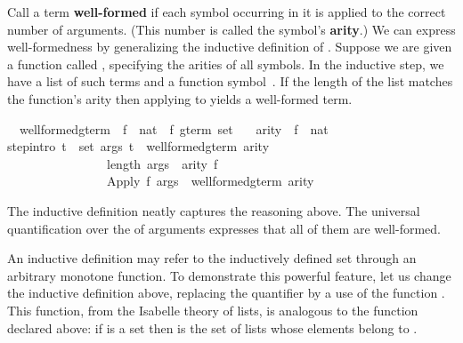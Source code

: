 \begin{isabellebody}
\begin{isamarkuptext}
Call a term \textbf{well-formed} if each symbol occurring in it is applied
to the correct number of arguments.  (This number is called the symbol's
\textbf{arity}.)  We can express well-formedness by
generalizing the inductive definition of
.
Suppose we are given a function called , specifying the arities
of all symbols.  In the inductive step, we have a list  of such
terms and a function  symbol~. If the length of the list matches the
function's arity  then applying  to  yields a well-formed
term.%
\end{isamarkuptext}%
\isamarkuptrue%
\isamarkupfalse%
\isanewline
\ \ well{\isacharunderscore}formed{\isacharunderscore}gterm\ {\isacharcolon}{\isacharcolon}\ {\isachardoublequoteopen}{\isacharparenleft}{\isacharprime}f\ {\isasymRightarrow}\ nat{\isacharparenright}\ {\isasymRightarrow}\ {\isacharprime}f\ gterm\ set{\isachardoublequoteclose}\isanewline
\ \ \ arity\ {\isacharcolon}{\isacharcolon}\ {\isachardoublequoteopen}{\isacharprime}f\ {\isasymRightarrow}\ nat{\isachardoublequoteclose}\isanewline
{}\isanewline
step{\isacharbrackleft}intro{\isacharbang}{\isacharbrackright}{\isacharcolon}\ {\isachardoublequoteopen}{\isasymlbrakk}{\isasymforall}t\ {\isasymin}\ set\ args{\isachardot}\ t\ {\isasymin}\ well{\isacharunderscore}formed{\isacharunderscore}gterm\ arity{\isacharsemicolon}\ \ \isanewline
\ \ \ \ \ \ \ \ \ \ \ \ \ \ \ \ length\ args\ {\isacharequal}\ arity\ f{\isasymrbrakk}\isanewline
\ \ \ \ \ \ \ \ \ \ \ \ \ \ \ {\isasymLongrightarrow}\ {\isacharparenleft}Apply\ f\ args{\isacharparenright}\ {\isasymin}\ well{\isacharunderscore}formed{\isacharunderscore}gterm\ arity{\isachardoublequoteclose}%
\begin{isamarkuptext}%
The inductive definition neatly captures the reasoning above.
The universal quantification over the
 of arguments expresses that all of them are well-formed.%
%
\end{isamarkuptext}%
\isamarkuptrue%
%
\isamarkuptrue%
%
\begin{isamarkuptext}%
% 
An inductive definition may refer to the
inductively defined  set through an arbitrary monotone function.  To
demonstrate this powerful feature, let us
change the  inductive definition above, replacing the
quantifier by a use of the function . This
function, from the Isabelle theory of lists, is analogous to the
function  declared above: if  is a set then
 is the set of lists whose elements belong to
.  


\end{isamarkuptext}
\end{isabellebody}
